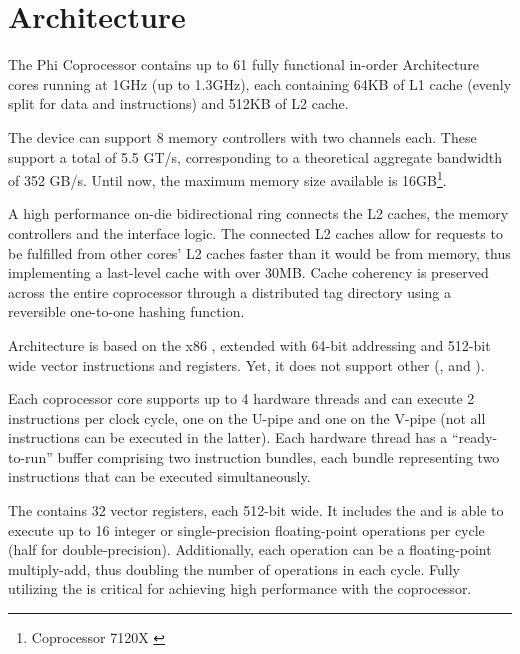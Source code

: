 \documentclass[../thesis]{subfiles}
\begin{document}
	\section{Architecture}
	\label{sec:mic:arch}

	The \intel\xeon Phi Coprocessor contains up to 61 fully functional in-order \intel\mic Architecture cores running at 1GHz (up to 1.3GHz), each containing 64KB of L1 cache (evenly split for data and instructions) and 512KB of L2 cache.

	The device can support 8 memory controllers with two  channels each. These support a total of 5.5 GT/s, corresponding to a theoretical aggregate bandwidth of 352 GB/s. Until now, the maximum memory size available is 16GB\footnote{\intel\xeonphi Coprocessor 7120X \cite{intel:datasheet:xeonphi}}.

	A high performance on-die bidirectional ring connects the L2 caches, the memory controllers and the \pcie interface logic. The connected L2 caches allow for requests to be fulfilled from other cores' L2 caches faster than it would be from memory, thus implementing a last-level cache with over 30MB. Cache coherency is preserved across the entire coprocessor through a distributed tag directory using a reversible one-to-one hashing function.

	\intel\mic Architecture is based on the x86 \isa, extended with 64-bit addressing and 512-bit wide \simd vector instructions and registers. Yet, it does not support other \simd\isas (\mmx, \intel\sse and \intel\avx).

	Each coprocessor core supports up to 4 hardware threads and can execute 2 instructions per clock cycle, one on the U-pipe and one on the V-pipe (not all instructions can be executed in the latter). Each hardware thread has a ``ready-to-run'' buffer comprising two instruction bundles, each bundle representing two instructions that can be executed simultaneously.

	The \vpu contains 32 vector registers, each 512-bit wide. It includes the \emu and is able to execute up to 16 integer or single-precision floating-point operations per cycle (half for double-precision). Additionally, each operation can be a floating-point multiply-add, thus doubling the number of operations in each cycle. Fully utilizing the \vpu is critical for achieving high performance with the coprocessor.
\end{document}
